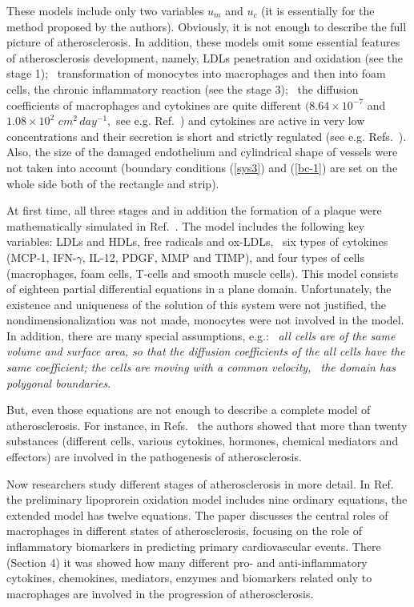 \documentclass[reqno]{amsart}            %
\numberwithin{equation}{section}
\begin{document}
These models include only two variables $u_m$ and $u_c$ (it is essentially for the method proposed by the authors). Obviously, it is not enough to describe the full picture of atherosclerosis. In addition, these models omit some essential features of atherosclerosis development, namely,
 LDLs penetration and oxidation (see   the stage 1); \
  transformation of monocytes into macrophages and then into foam cells,
 the chronic inflammatory reaction (see   the stage 3);
\ the diffusion coefficients of macrophages and cytokines are quite different
$(8.64\times10^{-7}$ and $1.08\times 10^2$ $cm^2\, day^{-1},$ see e.g. Ref.~\cite{HaoFried-14})
 and  cytokines are active in very low concentrations and their secretion is short and strictly regulated
(see e.g. Refs.~\cite{AitTalMalTed,cytokines-book}). Also,  the size of the damaged endothelium
and cylindrical shape of vessels were not taken into account (boundary conditions (\ref{sys3}) and  (\ref{bc-1}) are set on the whole side both of the rectangle and strip).

At first time, all three stages and in addition the formation of a plaque were mathematically simulated in Ref.~\cite{HaoFried-14}.
The model includes the following key variables:
LDLs and HDLs, free radicals and ox-LDLs, \ six types of cytokines (MCP-1, IFN-$\gamma$, IL-12, PDGF,  MMP and TIMP),
and four types of cells (macrophages, foam cells, T-cells and smooth muscle cells). This model consists of eighteen partial differential equations in a  plane domain. Unfortunately,  the existence and uniqueness of the solution of this system were not justified,  the nondimensionalization was not made, monocytes were not involved in the model. In addition,  there are many special assumptions, e.g.:  \ {\it all cells are of the same volume and surface area, so that the diffusion coefficients of the all cells have the same coefficient; the cells are moving with a common velocity, \ the domain has polygonal boundaries}.

But, even those equations are not enough to describe a complete model of atherosclerosis.
For instance, in Refs.~\cite{BujaMcAllister-07,UsmRibSadGil-15} the authors showed that  more than twenty substances (different cells, various cytokines, hormones, chemical mediators and effectors) are involved in the pathogenesis of atherosclerosis.

Now researchers study different stages of atherosclerosis in more detail.
In Ref.~\cite{CobSheMax}  the preliminary lipoprorein oxidation model includes nine ordinary equations, the extended model has twelve equations.
The paper\cite{GuiShiSunAkaMur-12} discusses the central roles of macrophages in different states of atherosclerosis, focusing on the role of inflammatory biomarkers in predicting primary cardiovascular events. There (Section 4) it was showed how many different
pro- and anti-inflammatory cytokines, chemokines, mediators, enzymes and biomarkers related only to macrophages
are involved in the progression of atherosclerosis.
\end{document}
